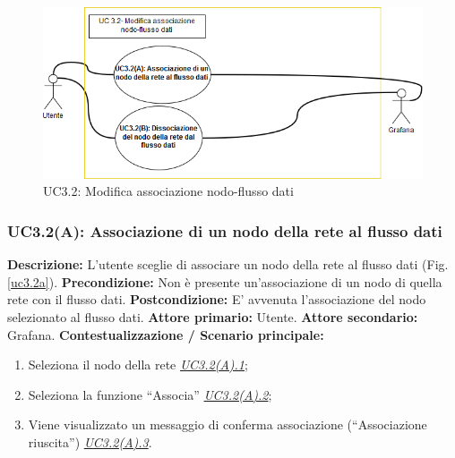                      \begin{figure}[!htbp]
                    	\centering
                    	\includegraphics[scale=0.7]{UC3-2.png}
                    	\caption{UC3.2: Modifica associazione nodo-flusso dati}
                    	\label{uc3.2}
                    \end{figure}
                
                \clearpage
                    
                \subsubsection{UC3.2(A): Associazione di un nodo della rete al flusso dati}
                    \textbf{Descrizione:} L’utente sceglie di associare un nodo della rete al flusso dati (Fig.\ref{uc3.2a}).
                    \newline
                    \textbf{Precondizione:} Non è presente un'associazione di un nodo di quella rete con il flusso dati.
                    \newline
                    \textbf{Postcondizione:} E' avvenuta l'associazione del nodo selezionato al flusso dati.
                    \newline
                    \textbf{Attore primario:} Utente.
                    \newline
                    \textbf{Attore secondario:} Grafana.
                    \newline
                    \textbf{Contestualizzazione / Scenario principale:} \begin{enumerate}
                        \item Seleziona il nodo della rete     \underline{\textit{UC3.2(A).1}};
                        \item Seleziona la funzione “Associa” \underline{\textit{UC3.2(A).2}};
                        \item Viene visualizzato un messaggio di conferma associazione (“Associazione riuscita”) \underline{\textit{UC3.2(A).3}}.
                \end{enumerate}
                    
